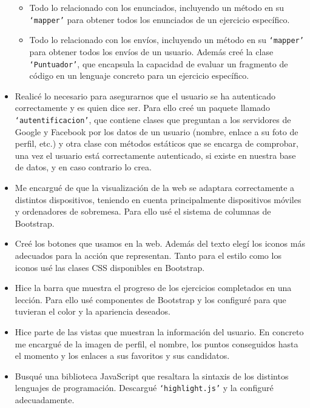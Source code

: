 \begin{itemize}
\begin{itemize}
\item
Todo lo relacionado con los enunciados, incluyendo un método en su \texttt{`mapper'} para obtener todos los enunciados de un ejercicio específico.

\item
Todo lo relacionado con los envíos, incluyendo un método en su \texttt{`mapper'} para obtener todos los envíos de un usuario. Además creé la clase \texttt{`Puntuador'}, que encapsula la capacidad de evaluar un fragmento de código en un lenguaje concreto para un ejercicio específico.
\end{itemize}
    
\item
Realicé lo necesario para asegurarnos que el usuario se ha autenticado correctamente y es quien dice ser. Para ello creé un paquete llamado \texttt{`autentificacion'}, que contiene clases que preguntan a los servidores de Google y Facebook por los datos de un usuario (nombre, enlace a su foto de perfil, etc.) y otra clase con métodos estáticos que se encarga de comprobar, una vez el usuario está correctamente autenticado, si existe en nuestra base de datos, y en caso contrario lo crea.

\item
Me encargué de que la visualización de la web se adaptara correctamente a distintos dispositivos, teniendo en cuenta principalmente dispositivos móviles y ordenadores de sobremesa. Para ello usé el sistema de columnas de Bootstrap.

\item
Creé los botones que usamos en la web. Además del texto elegí los iconos más adecuados para la acción que representan. Tanto para el estilo como los iconos usé las clases CSS disponibles en Bootstrap.

\item
Hice la barra que muestra el progreso de los ejercicios completados en una lección. Para ello usé componentes de Bootstrap y los configuré para que tuvieran el color y la apariencia deseados.

\item
Hice parte de las vistas que muestran la información del usuario. En concreto me encargué de la imagen de perfil, el nombre, los puntos conseguidos hasta el momento y los enlaces a sus favoritos y sus candidatos.

\item
Busqué una biblioteca JavaScript que resaltara la sintaxis de los distintos lenguajes de programación. Descargué \texttt{`highlight.js'} y la configuré adecuadamente.


\end{itemize}
